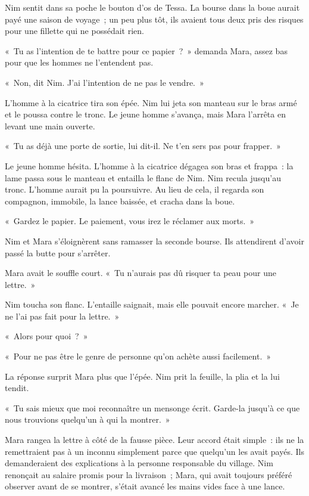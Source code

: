 \documentclass[10pt,a4paper]{article}
\begin{document}
Nim sentit dans sa poche le bouton d’os de Tessa. La bourse dans la boue aurait payé une saison de voyage~; un peu plus tôt, ils avaient tous deux pris des risques pour une fillette qui ne possédait rien.

«~Tu as l’intention de te battre pour ce papier~?~» demanda Mara, assez bas pour que les hommes ne l’entendent pas.

«~Non, dit Nim. J’ai l’intention de ne pas le vendre.~»

L’homme à la cicatrice tira son épée. Nim lui jeta son manteau sur le bras armé et le poussa contre le tronc. Le jeune homme s’avança, mais Mara l’arrêta en levant une main ouverte.

«~Tu as déjà une porte de sortie, lui dit-il. Ne t’en sers pas pour frapper.~»

Le jeune homme hésita. L’homme à la cicatrice dégagea son bras et frappa~: la lame passa sous le manteau et entailla le flanc de Nim. Nim recula jusqu’au tronc. L’homme aurait pu la poursuivre. Au lieu de cela, il regarda son compagnon, immobile, la lance baissée, et cracha dans la boue.

«~Gardez le papier. Le paiement, vous irez le réclamer aux morts.~»

Nim et Mara s’éloignèrent sans ramasser la seconde bourse. Ils attendirent d’avoir passé la butte pour s’arrêter.

Mara avait le souffle court. «~Tu n’aurais pas dû risquer ta peau pour une lettre.~»

Nim toucha son flanc. L’entaille saignait, mais elle pouvait encore marcher. «~Je ne l’ai pas fait pour la lettre.~»

«~Alors pour quoi~?~»

«~Pour ne pas être le genre de personne qu’on achète aussi facilement.~»

La réponse surprit Mara plus que l’épée. Nim prit la feuille, la plia et la lui tendit.

«~Tu sais mieux que moi reconnaître un mensonge écrit. Garde-la jusqu’à ce que nous trouvions quelqu’un à qui la montrer.~»

Mara rangea la lettre à côté de la fausse pièce. Leur accord était simple~: ils ne la remettraient pas à un inconnu simplement parce que quelqu’un les avait payés. Ils demanderaient des explications à la personne responsable du village. Nim renonçait au salaire promis pour la livraison~; Mara, qui avait toujours préféré observer avant de se montrer, s’était avancé les mains vides face à une lance.
\end{document}
